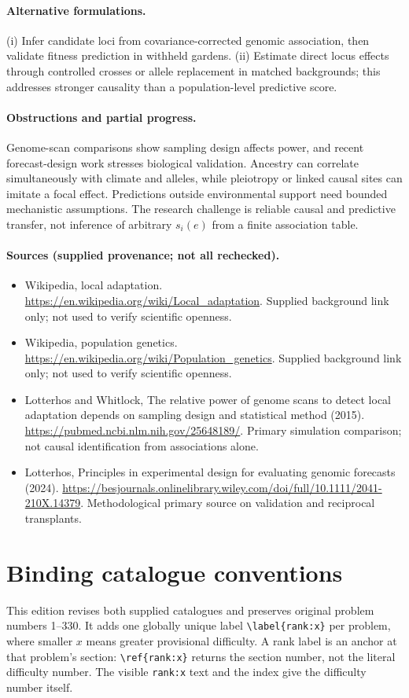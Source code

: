 \documentclass[11pt]{article}
\begin{document}
\paragraph{Alternative formulations.} (i) Infer candidate loci from covariance-corrected genomic association, then validate fitness prediction in withheld gardens. (ii) Estimate direct locus effects through controlled crosses or allele replacement in matched backgrounds; this addresses stronger causality than a population-level predictive score.
\paragraph{Obstructions and partial progress.} Genome-scan comparisons show sampling design affects power, and recent forecast-design work stresses biological validation. Ancestry can correlate simultaneously with climate and alleles, while pleiotropy or linked causal sites can imitate a focal effect. Predictions outside environmental support need bounded mechanistic assumptions. The research challenge is reliable causal and predictive transfer, not inference of arbitrary $s_i(e)$ from a finite association table.
\paragraph{Sources (supplied provenance; not all rechecked).}
\begin{itemize}
\item Wikipedia, local adaptation. \url{https://en.wikipedia.org/wiki/Local_adaptation}. Supplied background link only; not used to verify scientific openness.
\item Wikipedia, population genetics. \url{https://en.wikipedia.org/wiki/Population_genetics}. Supplied background link only; not used to verify scientific openness.
\item Lotterhos and Whitlock, The relative power of genome scans to detect local adaptation depends on sampling design and statistical method (2015). \url{https://pubmed.ncbi.nlm.nih.gov/25648189/}. Primary simulation comparison; not causal identification from associations alone.
\item Lotterhos, Principles in experimental design for evaluating genomic forecasts (2024). \url{https://besjournals.onlinelibrary.wiley.com/doi/full/10.1111/2041-210X.14379}. Methodological primary source on validation and reciprocal transplants.
\end{itemize}


\section*{Binding catalogue conventions}
This edition revises both supplied catalogues and preserves original problem numbers 1--330. It adds one globally unique label \verb|\label{rank:x}| per problem, where smaller $x$ means greater provisional difficulty. A rank label is an anchor at that problem's section: \verb|\ref{rank:x}| returns the section number, not the literal difficulty number. The visible \texttt{rank:x} text and the index give the difficulty number itself.
\end{document}
